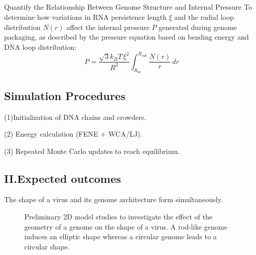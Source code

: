 \documentclass[12pt]{article}
\begin{document}
\begin{flushleft}
   
   
   

\subsection*{}

Quantify the Relationship Between Genome Structure and Internal Pressure
To determine how variations in RNA persistence length \( \xi \) and the radial loop distribution \( N(r) \) affect the internal pressure \( P \) generated during genome packaging, as described by the pressure equation based on bending energy and DNA loop distribution:\\

\begin{equation}
P = \frac{\sqrt{3} k_B T \, \xi^2}{R^3} \int_{R_\text{in}}^{R_\text{out}} \frac{N(r)}{r} \, dr
\end{equation}

\subsection*{Simulation Procedures}
(1)Initialization of DNA chains and crowders.

(2) Energy calculation (FENE + WCA/LJ).

(3) Repeated Monte Carlo updates to reach equilibrium.


\subsection*{II.Expected outcomes} 
The shape of a virus and its genome architecture form simultaneously.

	
\begin{figure}[!ht]
  \centering
  \caption{Preliminary 2D model studies to
investigate the effect of the geometry of a
genome on the shape of a virus. A rod-like
genome induces an elliptic shape whereas a
circular genome leads to a circular shape.}
\end{figure}





\end{flushleft}
\end{document}
